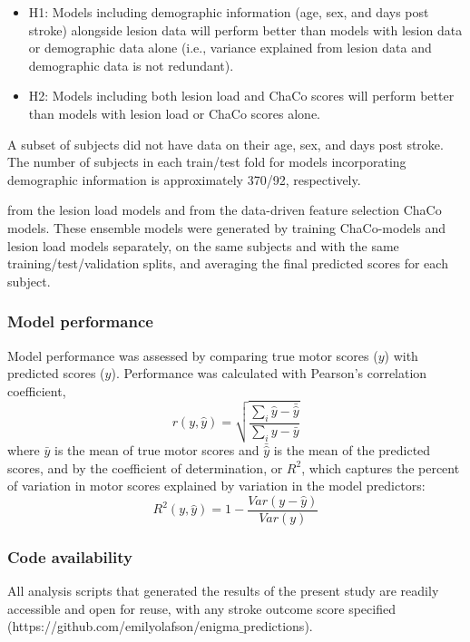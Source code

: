 \documentclass[10pt]{article}
\begin{document}
\begin{itemize}
\item H1: Models including demographic information (age, sex, and days post stroke) alongside lesion data will perform better than models with lesion data or demographic data alone (i.e., variance explained from lesion data and demographic data is not redundant).
\item H2: Models including both lesion load and ChaCo scores will perform better than models with lesion load or ChaCo scores alone.
\end{itemize}

A subset of subjects did not have data on their age, sex, and days post stroke. The number of subjects in each train/test fold for models incorporating demographic information is approximately 370/92, respectively.

from the lesion load models and from the data-driven feature selection ChaCo models. These ensemble models were generated by training ChaCo-models and lesion load models separately, on the same subjects and with the same training/test/validation splits, and averaging the final predicted scores for each subject. 



\subsubsection{Model performance}
Model performance was assessed by comparing true motor scores ($y$) with predicted scores ($\hat{y}$). Performance was calculated with Pearson's correlation coefficient, 
\begin{equation}
    r(y, \hat{y}) = \sqrt{\frac{\sum_i{\hat{y}-\bar{\hat{y}}}}{\sum_i{y-\bar{y}}}}
\end{equation}
where $\bar{y}$ is the mean of true motor scores and  $\bar{\hat{y}}$ is the mean of the predicted scores, and by the coefficient of determination, or $R^2$, which captures the percent of variation in motor scores explained by variation in the model predictors:
\begin{equation}
    R^2(y, \hat{y}) = 1 - \frac{Var(y-\hat{y})}{Var(y)}
\end{equation}


\subsubsection*{Code availability}
All analysis scripts that generated the results of the present study are readily accessible and open for reuse, with any stroke outcome score specified (https://github.com/emilyolafson/enigma$\_$predictions).
\end{document}
